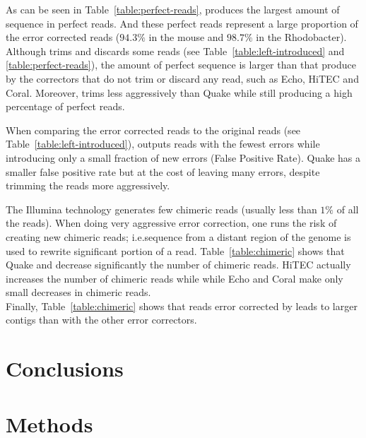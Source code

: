 \documentclass[10pt]{bmc_article}
\newenvironment{bmcformat}{\fussy\setboolean{publ}{true}}{\fussy}
\begin{document}
\begin{bmcformat}
As can be seen in Table~\ref{table:perfect-reads}, \quorum produces the largest amount of sequence in perfect reads.
And these perfect reads represent a large proportion of the error corrected reads ($94.3\%$ in the mouse and $98.7\%$ in the Rhodobacter).
Although \quorum trims and discards some reads (see Table~\ref{table:left-introduced} and \ref{table:perfect-reads}), the amount of perfect sequence is larger than that produce by the correctors that do not trim or discard any read, such as Echo, HiTEC and Coral.
Moreover, \quorum trims less aggressively than Quake while still producing a high percentage of perfect reads.

When comparing the error corrected reads to the original reads (see Table~\ref{table:left-introduced}), \quorum outputs reads with the fewest errors while introducing only a small fraction of new errors (False Positive Rate).
Quake has a smaller false positive rate but at the cost of leaving many errors, despite trimming the reads more aggressively. 

The Illumina technology generates few chimeric reads (usually less than $1\%$ of all the reads).
When doing very aggressive error correction, one runs the risk of creating new chimeric reads;
i.e.\@ sequence from a distant region of the genome is used to rewrite significant portion of a read.
Table~\ref{table:chimeric} shows that Quake and \quorum decrease significantly the number of chimeric reads.
HiTEC actually  increases the number of chimeric reads while while Echo and Coral make only small decreases in chimeric reads.\\

Finally, Table~\ref{table:chimeric} shows that reads error corrected by \quorum leads to larger contigs than with the other error correctors.


\section*{Conclusions}


  
\section*{Methods}
\label{sec:Methods}


\end{bmcformat}
\end{document}
